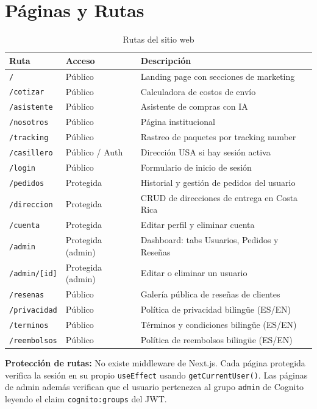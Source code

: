 \documentclass[12pt,a4paper]{article}
\begin{document}
\section{Páginas y Rutas}

\begin{table}[H]
\centering
\begin{tabular}{@{}lll@{}}
\toprule
\textbf{Ruta} & \textbf{Acceso} & \textbf{Descripción} \\
\midrule
\texttt{/} & Público & Landing page con secciones de marketing \\
\texttt{/cotizar} & Público & Calculadora de costos de envío \\
\texttt{/asistente} & Público & Asistente de compras con IA \\
\texttt{/nosotros} & Público & Página institucional \\
\texttt{/tracking} & Público & Rastreo de paquetes por tracking number \\
\texttt{/casillero} & Público / Auth & Dirección USA si hay sesión activa \\
\texttt{/login} & Público & Formulario de inicio de sesión \\
\texttt{/pedidos} & Protegida & Historial y gestión de pedidos del usuario \\
\texttt{/direccion} & Protegida & CRUD de direcciones de entrega en Costa Rica \\
\texttt{/cuenta} & Protegida & Editar perfil y eliminar cuenta \\
\texttt{/admin} & Protegida (admin) & Dashboard: tabs Usuarios, Pedidos y Reseñas \\
\texttt{/admin/[id]} & Protegida (admin) & Editar o eliminar un usuario \\
\texttt{/resenas} & Público & Galería pública de reseñas de clientes \\
\texttt{/privacidad} & Público & Política de privacidad bilingüe (ES/EN) \\
\texttt{/terminos} & Público & Términos y condiciones bilingüe (ES/EN) \\
\texttt{/reembolsos} & Público & Política de reembolsos bilingüe (ES/EN) \\
\bottomrule
\end{tabular}
\caption{Rutas del sitio web}
\end{table}

\begin{nexobox}
\textbf{Protección de rutas:} No existe middleware de Next.js. Cada página protegida
verifica la sesión en su propio \texttt{useEffect} usando \texttt{getCurrentUser()}.
Las páginas de admin además verifican que el usuario pertenezca al grupo \texttt{admin}
de Cognito leyendo el claim \texttt{cognito:groups} del JWT.
\end{nexobox}
\end{document}
